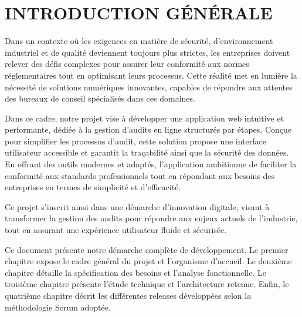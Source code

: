 \chapter*{INTRODUCTION GÉNÉRALE}
\adjustmtc
\thispagestyle{MyStyle}

\noindent Dans un contexte où les exigences en matière de sécurité, d'environnement industriel et de qualité deviennent toujours plus strictes, les entreprises doivent relever des défis complexes pour assurer leur conformité aux normes réglementaires tout en optimisant leurs processus. Cette réalité met en lumière la nécessité de solutions numériques innovantes, capables de répondre aux attentes des bureaux de conseil spécialisés dans ces domaines.

Dans ce cadre, notre projet vise à développer une application web intuitive et performante, dédiée à la gestion d'audits en ligne structurés par étapes. Conçue pour simplifier les processus d'audit, cette solution propose une interface utilisateur accessible et garantit la traçabilité ainsi que la sécurité des données. En offrant des outils modernes et adaptés, l'application ambitionne de faciliter la conformité aux standards professionnels tout en répondant aux besoins des entreprises en termes de simplicité et d'efficacité.

Ce projet s'inscrit ainsi dans une démarche d'innovation digitale, visant à transformer la gestion des audits pour répondre aux enjeux actuels de l'industrie, tout en assurant une expérience utilisateur fluide et sécurisée.

Ce document présente notre démarche complète de développement. Le premier chapitre expose le cadre général du projet et l'organisme d'accueil. Le deuxième chapitre détaille la spécification des besoins et l'analyse fonctionnelle. Le troisième chapitre présente l'étude technique et l'architecture retenue. Enfin, le quatrième chapitre décrit les différentes releases développées selon la méthodologie Scrum adoptée.
